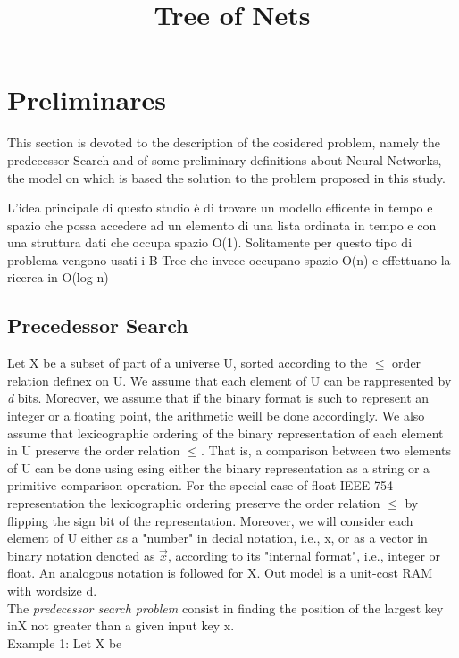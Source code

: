 \documentclass[]{article}
\title{\textbf{Tree of Nets}}
\author{\vspace{-7ex}}
\date{\vspace{-10ex}}
\begin{document}
	\maketitle
	
	\section{Preliminares}
	This section is devoted to the description of the cosidered problem, namely the predecessor Search and of some preliminary definitions about Neural Networks, the model on which is based the solution to the problem proposed in this study.
	
	L'idea principale di questo studio è di trovare un modello efficente in tempo e spazio che possa accedere ad un elemento di una lista ordinata in tempo e con una struttura dati che occupa spazio O(1). Solitamente per questo tipo di problema vengono usati i B-Tree che invece occupano spazio O(n) e effettuano la ricerca in O(log n)
	
	\subsection{Precedessor Search}
	Let X be a subset of part of a universe U, sorted according to the $\leq$ order relation definex on U. We assume that each element of U can be rappresented by \textit{d} bits. Moreover, we assume that if the binary format is such to represent an integer or a floating point, the arithmetic weill be done accordingly. We also assume that lexicographic ordering of the binary representation of each element in U preserve the order relation $\leq$. That is, a comparison between two elements of U can be done using esing either the binary representation as a string or a primitive comparison operation. For the special case of float IEEE 754 representation the lexicographic ordering preserve the order relation $\leq$ by flipping the sign bit of the representation. Moreover, we will consider each element of U either as a "number" in decial notation, i.e., x, or as a vector in binary notation denoted as $\vec{x}$, according to its "internal format", i.e., integer or float. An analogous notation is followed for X. Out model is a unit-cost RAM with wordsize d.\\
	The \textit{predecessor search problem} consist in finding the position of the largest key inX not greater than a given input key x. \\
	
	Example 1: Let X be \\
	 
\end{document}
